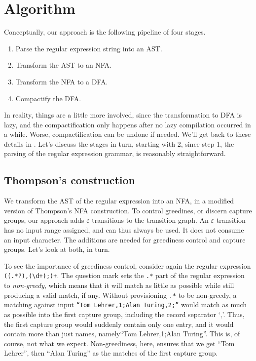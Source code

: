 \documentclass[english]{sigplanconf}
\theoremstyle{definition}
\begin{document}
\section{Algorithm}
Conceptually, our approach is the following pipeline of four stages.
\begin{enumerate}
  \item Parse the regular expression string into an AST.
  \item Transform the AST to an NFA.
  \item Transform the NFA to a DFA.
  \item Compactify the DFA.
\end{enumerate}

In reality, things are a little more involved, since the transformation
to DFA is lazy, and the compactification only happens after no lazy
compilation occurred in a while. Worse, compactification can be
undone if needed. We'll get back to these details in .
Let's discuss the stages in turn, starting with 2, since step 1,
the parsing of the regular expression grammar, is reasonably
straightforward.


\subsection{Thompson's construction} 

We transform the AST of the regular expression into an NFA,
in a modified version of Thompson's NFA construction. To
control greedines, or discern capture groups, our approach adds
$\varepsilon$ transitions to the transition graph. An
$\varepsilon$-transition has no input range assigned, and can thus always
be used. It does not consume an input character.
The additions are needed for greediness control and capture groups.
Let's look at both, in turn.

To see the importance of greediness control, consider again the regular
expression \texttt{((.*?),(\textbackslash{}d+);)+}. The question
mark sets the \texttt{.*} part of the regular expression to
\emph{non-greedy}, which means that it will match as little as
possible while still producing a valid match, if any.  Without
provisioning \texttt{.*} to be non-greedy, a matching against input
\texttt{``Tom Lehrer,1;Alan Turing,2;''} would match as much as
possible into the first capture group, including the record separator
`,'.  Thus, the first capture group would suddenly contain only one
entry, and it would contain more than just names, namely``Tom
Lehrer,1;Alan Turing''.  This is, of course, not what we expect.
Non-greediness, here, ensures that we get ``Tom Lehrer'', then
``Alan Turing'' as the matches of the first capture group.
\end{document}
